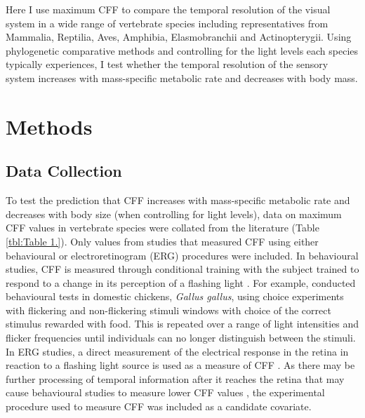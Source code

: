 Here I use maximum CFF to compare the temporal resolution of the visual system in a wide range of vertebrate species including representatives from Mammalia, Reptilia, Aves, Amphibia, Elasmobranchii and Actinopterygii. Using phylogenetic comparative methods and controlling for the light levels each species typically experiences, I test whether the temporal resolution of the sensory system increases with mass-specific metabolic rate and decreases with body mass.

\section{Methods}
\subsection{Data Collection}
To test the prediction that CFF increases with mass-specific metabolic rate and decreases with body size (when controlling for light levels), data on maximum CFF values in vertebrate species were collated from the literature (Table \ref{tbl:Table 1.}). Only values from studies that measured CFF using either behavioural or electroretinogram (ERG) procedures were included. In behavioural studies, CFF is measured through conditional training with the subject trained to respond to a change in its perception of a flashing light \citep{d1998can,rubene2010presence}. For example, \cite{lisney2011behavioural} conducted behavioural tests in domestic chickens, \textit{Gallus gallus}, using choice experiments with flickering and non-flickering stimuli windows with choice of the correct stimulus rewarded with food. This is repeated over a range of light intensities and flicker frequencies until individuals can no longer distinguish between the stimuli. In ERG studies, a direct measurement of the electrical response in the retina in reaction to a flashing light source is used as a measure of CFF \citep{d1998can,schwartz2010visual}. As there may be further processing of temporal information after it reaches the retina that may cause behavioural studies to measure lower CFF values \citep{d1998can}, the experimental procedure used to measure CFF was included as a candidate covariate. 

